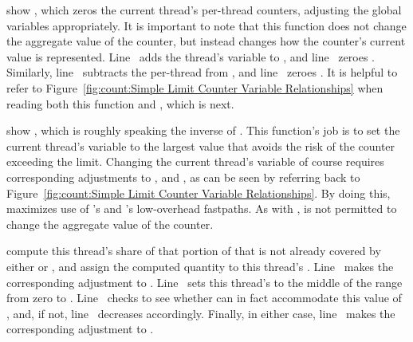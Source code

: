 \begin{fcvref}
 show ,
which zeros the current thread's
per-thread counters, adjusting the global variables appropriately.
It is important to note that this function does not change the aggregate
value of the counter, but instead changes how the counter's current value
is represented.
Line~ adds the thread's  variable to ,
and line~ zeroes .
Similarly, line~ subtracts the per-thread  from
, and line~ zeroes .
It is helpful to refer to
Figure~\ref{fig:count:Simple Limit Counter Variable Relationships}
when reading both this function and , which is next.
\end{fcvref}

\begin{fcvref}
 show ,
which is roughly speaking
the inverse of .
This function's job is to set the current thread's
 variable to the largest value that avoids the risk
of the counter exceeding the  limit.
Changing the current thread's  variable of course
requires corresponding adjustments to , 
and , as can be seen by referring back to
Figure~\ref{fig:count:Simple Limit Counter Variable Relationships}.
By doing this,  maximizes use of
's and 's low-overhead fastpaths.
As with ,  is not permitted
to change the aggregate value of the counter.

 compute this thread's share of
that portion of
 that is not already covered by either
 or , and assign the
computed quantity to this thread's .
Line~ makes the corresponding adjustment to .
Line~ sets this thread's  to the middle of the range
from zero to .
Line~ checks to see whether  can in fact accommodate
this value of , and, if not,
line~ decreases 
accordingly.
Finally, in either case,
line~ makes the corresponding adjustment to
.
\end{fcvref}

